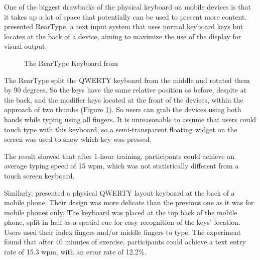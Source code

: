 \documentclass[11pt]{article}
\begin{document}
One of the biggest drawbacks of the physical keyboard on mobile devices is that it takes up a lot of space that potentially can be used to present more content. \citet{10.1145/1851600.1851630} presented RearType, a text input system that uses normal keyboard keys but locates at the back of a device, aiming to maximize the use of the display for visual output. 
\begin{figure}[H]
\centering
{}\hfill
{}\hfill
\caption{The RearType Keyboard from \citep{10.1145/1851600.1851630}} \label{fig:rearType}
\end{figure}
The RearType split the QWERTY keyboard from the middle and rotated them by 90 degrees. So the keys have the same relative position as before, despite at the back, and the modifier keys located at the front of the devices, within the approach of two thumbs (Figure \ref{fig:rearType}). So users can grab the devices using both hands while typing using all fingers. It is unreasonable to assume that users could touch type with this keyboard, so a semi-transparent floating widget on the screen was used to show which key was pressed.

The result showed that after 1-hour training, participants could achieve an average typing speed of 15 wpm, which was not statistically different from a touch screen keyboard. 

Similarly, \citet{10.1145/2212776.2223676} presented a physical QWERTY layout keyboard at the back of a mobile phone. Their design was more delicate than the previous one as it was for mobile phones only. The keyboard was placed at the top back of the mobile phone, split in half as a spatial cue for easy recognition of the keys' location. Users used their index fingers and/or middle fingers to type. The experiment found that after 40 minutes of exercise, participants could achieve a text entry rate of 15.3 wpm, with an error rate of 12.2\%. 
\end{document}
